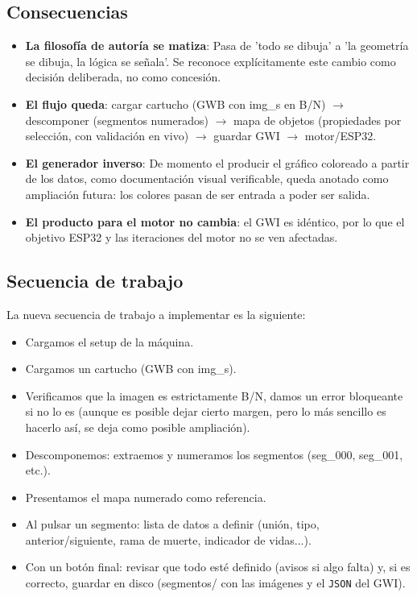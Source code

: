 \subsection{Consecuencias}
\begin{itemize}
	\item \textbf{La filosofía de autoría se matiza}: Pasa de 'todo se dibuja' a 'la geometría se dibuja, la lógica se señala'. Se reconoce explícitamente este cambio como decisión deliberada, no como concesión.
	\item \textbf{El flujo queda}: cargar cartucho (GWB con img\_s en B/N) $\longrightarrow$ descomponer (segmentos numerados) $\longrightarrow$ mapa de objetos (propiedades por selección, con validación en vivo) $\longrightarrow$ guardar GWI $\longrightarrow$ motor/ESP32.
	\item \textbf{El generador inverso}: De momento el producir el gráfico coloreado a partir de los datos, como documentación visual verificable, queda anotado como ampliación futura: los colores pasan de ser entrada a poder ser salida.
	\item \textbf{El producto para el motor no cambia}: el GWI es idéntico, por lo que el objetivo ESP32 y las iteraciones del motor no se ven afectadas.
\end{itemize}

\subsection{Secuencia de trabajo}

La nueva secuencia de trabajo a implementar es la siguiente:

\begin{itemize}
	\item Cargamos el setup de la máquina.
	\item Cargamos un cartucho (GWB con img\_s).
	\item Verificamos que la imagen es estrictamente B/N, damos un error bloqueante si no lo es (aunque es posible dejar cierto margen, pero lo más sencillo es hacerlo así, se deja como posible ampliación).
	\item Descomponemos: extraemos y numeramos los segmentos (seg\_000, seg\_001, etc.).
	\item Presentamos el mapa numerado como referencia.
	\item Al pulsar un segmento: lista de datos a definir (unión, tipo, anterior/siguiente, rama de muerte, indicador de vidas...).
	\item Con un botón final: revisar que todo esté definido (avisos si algo falta) y, si es correcto, guardar en disco (segmentos/ con las imágenes y el \texttt{JSON} del GWI).
\end{itemize}








\clearpage

